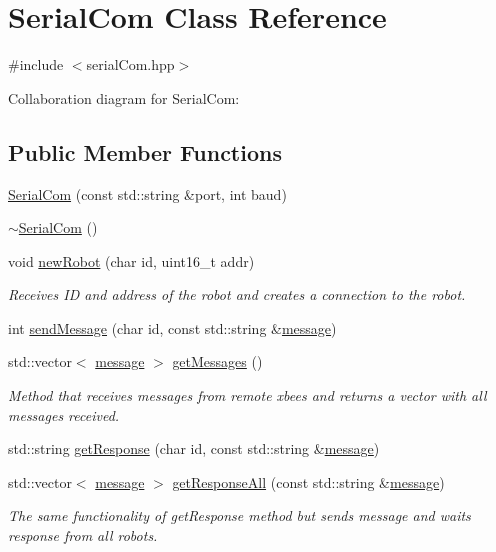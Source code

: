 \hypertarget{class_serial_com}{}\section{Serial\+Com Class Reference}
\label{class_serial_com}


{\ttfamily \#include $<$serial\+Com.\+hpp$>$}



Collaboration diagram for Serial\+Com\+:
\subsection*{Public Member Functions}
\begin{DoxyCompactItemize}
\item 
\hyperlink{class_serial_com_af2d4922981a43216d0e7a2f0b02cfff7}{Serial\+Com} (const std\+::string \&port, int baud)
\item 
\hyperlink{class_serial_com_a5582cf804e661a24cb32720b31a2f9fe}{$\sim$\+Serial\+Com} ()
\item 
void \hyperlink{class_serial_com_a49c37690ef5f8c76a4c49f568dc1bb7f}{new\+Robot} (char id, uint16\+\_\+t addr)
\begin{DoxyCompactList}\small\item\em Receives ID and address of the robot and creates a connection to the robot. \end{DoxyCompactList}\item 
int \hyperlink{class_serial_com_a0a371f0bf00f14bcf6ef23c752276144}{send\+Message} (char id, const std\+::string \&\hyperlink{structmessage}{message})
\item 
std\+::vector$<$ \hyperlink{structmessage}{message} $>$ \hyperlink{class_serial_com_a31bc443df9f0d736ff9c06e7dcb4ecb6}{get\+Messages} ()
\begin{DoxyCompactList}\small\item\em Method that receives messages from remote xbees and returns a vector with all messages received. \end{DoxyCompactList}\item 
std\+::string \hyperlink{class_serial_com_a7680deb087f1746d4d8c38d6fc2d25fb}{get\+Response} (char id, const std\+::string \&\hyperlink{structmessage}{message})
\item 
std\+::vector$<$ \hyperlink{structmessage}{message} $>$ \hyperlink{class_serial_com_a9b99a72ec721ac5c30ec1b9683d59188}{get\+Response\+All} (const std\+::string \&\hyperlink{structmessage}{message})
\begin{DoxyCompactList}\small\item\em The same functionality of get\+Response method but sends message and waits response from all robots. \end{DoxyCompactList}\item 

\end{DoxyCompactItemize}
